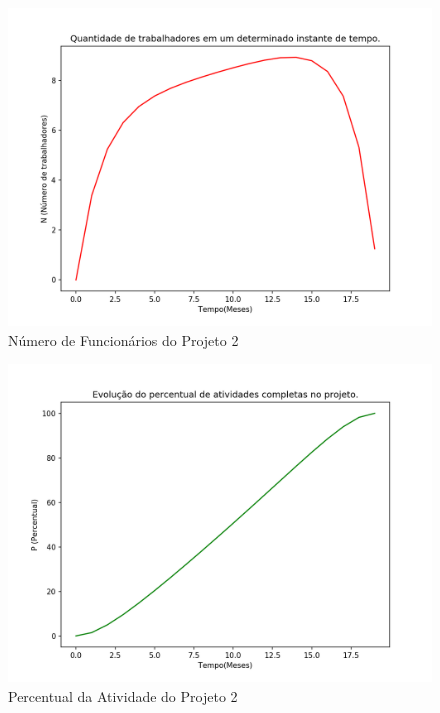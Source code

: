 \documentclass[14pt, oneside]{book}
\theoremstyle{definition}
\begin{document}
            \begin{figure}[H]
                \centering
                \includegraphics[scale=0.9]{empresa2_n.png}
                \caption{Número de Funcionários do Projeto 2}
                \label{empresa2_n}
            \end{figure}
            
            \begin{figure}[H]
                \centering
                \includegraphics[scale=0.9]{empresa2_p.png}
                \caption{Percentual da Atividade do Projeto 2}
                \label{empresa2_p}
            \end{figure}
            
\end{document}
